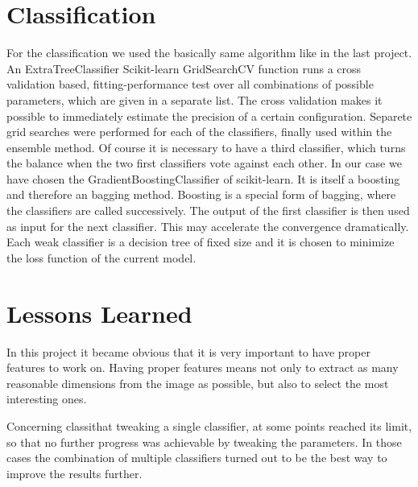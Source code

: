 \documentclass[a4paper, 11pt]{article}
\begin{document}
	\section{Classification}
	For the classification we used the basically same algorithm like in the last project. An ExtraTreeClassifier 
	Scikit-learn GridSearchCV function runs a cross validation based, fitting-performance test over all combinations of possible parameters, which are given in a separate list. The cross validation makes it possible to immediately estimate the precision of a certain configuration. Separete grid searches were performed for each of the classifiers, finally used within the ensemble method. 
		Of course it is necessary to have a third classifier, which turns the balance when the two first classifiers vote against each other. In our case we have chosen the  GradientBoostingClassifier of scikit-learn. It is itself a boosting and therefore an bagging method. Boosting is a special form of bagging, where the classifiers are called successively. The output of the first classifier is then used as input for the next classifier. This may accelerate the convergence dramatically. 
	Each weak classifier is a decision tree of fixed size and it is chosen to minimize the loss function of the current model.
	
	\section{Lessons Learned} 
	In this project it became obvious that it is very important to have proper features to work on. Having proper features means not only to extract as many reasonable dimensions from the image as possible, but also to select the most interesting ones.

	Concerning classithat tweaking a single classifier, at some points reached its limit, so that no further progress was achievable by tweaking the parameters. In those cases the combination of multiple classifiers turned out to be the best way to improve the results further. 
	
\end{document}
